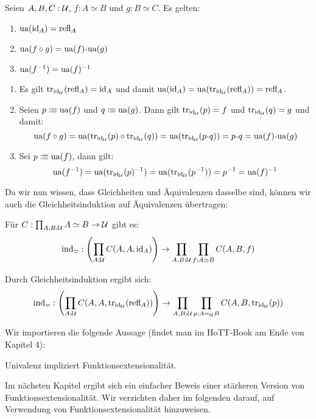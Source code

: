 \begin{bemerkung}
  Seien $A,B,C:\mathcal{U}$, $f:A\simeq B$ und $g:B\simeq C$. Es gelten:
  \begin{enumerate}
  \item $\mathrm{ua}(\mathrm{id}_A)=\mathrm{refl}_A$
  \item $\ua(f\circ g)=\ua(f)\kon \ua(g)$
  \item $\mathrm{ua}(f^{-1})=\mathrm{ua}(f)^{-1}$
  \end{enumerate}
\end{bemerkung}
\begin{beweis}
  \begin{enumerate}
  \item Es gilt $\mathrm{tr}_{\mathrm{id}_{\mathcal{U}}}(\mathrm{refl}_A)=\mathrm{id}_A$ und damit $\mathrm{ua}(\mathrm{id}_A)=\mathrm{ua}(\mathrm{tr}_{\mathrm{id}_{\mathcal{U}}}(\mathrm{refl}_A))=\mathrm{refl}_A$.
  \item Seien $p\vcentcolon\mspace{-1.2mu}\equiv\mathrm{ua}(f)$ und $q\vcentcolon\mspace{-1.2mu}\equiv\mathrm{ua}(g)$. Dann gilt $\mathrm{tr}_{\mathrm{id}_{\mathcal{U}}}(p)=f$ und $\mathrm{tr}_{\mathrm{id}_{\mathcal{U}}}(q)=g$ und damit:
    \[
      \ua(f\circ g)=\ua(\transp_{\id_\mU}(p)\circ \transp_{\id_\mU}(q))=\ua(\transp_{\id_\mU}(p\kon q))=p\kon q=\ua(f)\kon\ua(g)
    \]
  \item Sei $p\vcentcolon\mspace{-1.2mu}\equiv\mathrm{ua}(f)$, dann gilt:
    \[
      \mathrm{ua}(f^{-1})=\mathrm{ua}(\mathrm{tr}_{\mathrm{id}_{\mathcal{U}}}(p)^{-1})=\mathrm{ua}(\mathrm{tr}_{\mathrm{id}_{\mathcal{U}}}(p^{-1}))=p^{-1}=\mathrm{ua}(f)^{-1}
    \]
  \end{enumerate}
\end{beweis}

Da wir nun wissen, dass Gleichheiten und Äquivalenzen dasselbe sind, können wir auch die Gleichheitsinduktion auf Äquivalenzen übertragen:
\begin{lemma}[Äquivalenzinduktion]
  Für $C:\prod_{A,B:\mathcal{U}}A\simeq B\to \mathcal{U}$ gibt es:
  \[
    \mathrm{ind}_{\simeq}:\left(\prod_{A:\mathcal{U}}C(A,A,\mathrm{id}_A)\right)\to \prod_{A,B:\mathcal{U}}\prod_{f:A\simeq B}C(A,B,f)
  \]
\end{lemma}
\begin{beweis}
  Durch Gleichheitsinduktion ergibt sich:
  \[
    \mathrm{ind}_{=}:\left(\prod_{A:\mathcal{U}}C(A,A,\mathrm{tr}_{\mathrm{id}_{\mathcal{U}}}(\mathrm{refl}_A))\right)\to\prod_{A,B:\mathcal{U}}\prod_{p:A=_{\mathcal{U}}B}C(A,B,\mathrm{tr}_{\mathrm{id}_{\mathcal{U}}}(p))
  \]
\end{beweis}

Wir importieren die folgende Aussage (findet man im HoTT-Book am Ende von Kapitel 4): 
\begin{fakt}
  Univalenz impliziert Funktionsextensionalität.
\end{fakt}
Im nächsten Kapitel ergibt sich ein einfacher Beweis einer stärkeren Version von Funktionsextensionalität.
Wir verzichten daher im folgenden darauf, auf Verwendung von Funktionsextensionalität hinzuweisen.

